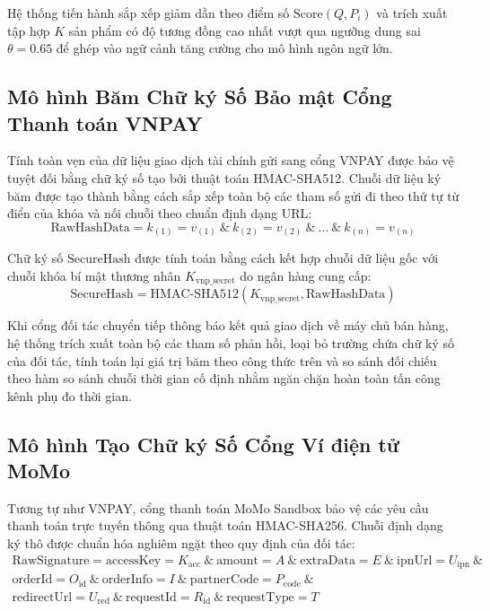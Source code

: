 Hệ thống tiến hành sắp xếp giảm dần theo điểm số $\text{Score}(Q, P_i)$ và trích xuất tập hợp $K$ sản phẩm có độ tương đồng cao nhất vượt qua ngưỡng dung sai $\theta = 0.65$ để ghép vào ngữ cảnh tăng cường cho mô hình ngôn ngữ lớn.

\subsection{Mô hình Băm Chữ ký Số Bảo mật Cổng Thanh toán VNPAY}
Tính toàn vẹn của dữ liệu giao dịch tài chính gửi sang cổng VNPAY được bảo vệ tuyệt đối bằng chữ ký số tạo bởi thuật toán HMAC-SHA512. Chuỗi dữ liệu ký băm được tạo thành bằng cách sắp xếp toàn bộ các tham số gửi đi theo thứ tự từ điển của khóa và nối chuỗi theo chuẩn định dạng URL:
\begin{equation}
\text{RawHashData} = k_{(1)}=v_{(1)} \ \& \ k_{(2)}=v_{(2)} \ \& \ \dots \ \& \ k_{(n)}=v_{(n)}
\end{equation}

Chữ ký số $\text{SecureHash}$ được tính toán bằng cách kết hợp chuỗi dữ liệu gốc với chuỗi khóa bí mật thương nhân $K_{\text{vnp\_secret}}$ do ngân hàng cung cấp:
\begin{equation}
\text{SecureHash} = \text{HMAC-SHA512}(K_{\text{vnp\_secret}}, \text{RawHashData})
\end{equation}

Khi cổng đối tác chuyển tiếp thông báo kết quả giao dịch về máy chủ bán hàng, hệ thống trích xuất toàn bộ các tham số phản hồi, loại bỏ trường chứa chữ ký số của đối tác, tính toán lại giá trị băm theo công thức trên và so sánh đối chiếu theo hàm so sánh chuỗi thời gian cố định nhằm ngăn chặn hoàn toàn tấn công kênh phụ đo thời gian.

\subsection{Mô hình Tạo Chữ ký Số Cổng Ví điện tử MoMo}
Tương tự như VNPAY, cổng thanh toán MoMo Sandbox bảo vệ các yêu cầu thanh toán trực tuyến thông qua thuật toán HMAC-SHA256. Chuỗi định dạng ký thô được chuẩn hóa nghiêm ngặt theo quy định của đối tác:
\begin{equation}
\begin{split}
\text{RawSignature} = \text{accessKey}=K_{\text{acc}} \ \& \ \text{amount}=A \ \& \ \text{extraData}=E \ \& \ \text{ipnUrl}=U_{\text{ipn}} \ \& \\
\text{orderId}=O_{\text{id}} \ \& \ \text{orderInfo}=I \ \& \ \text{partnerCode}=P_{\text{code}} \ \& \\
\text{redirectUrl}=U_{\text{red}} \ \& \ \text{requestId}=R_{\text{id}} \ \& \ \text{requestType}=T
\end{split}
\end{equation}

